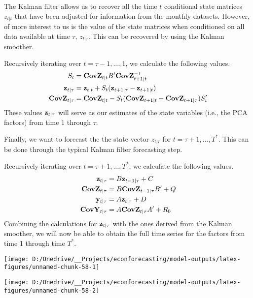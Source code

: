 \documentclass[11pt, letterpaper]{article}\usepackage[]{graphicx}\usepackage[]{color}
\newcommand{\vv}[1]{\textcolor{black}{\mathbf{#1}}}
\begin{document}
The Kalman filter allows us to recover all the time $t$ conditional state matrices $z_{t|t}$ that have been adjusted for information from the monthly datasets. However, of more interest to us is the value of the state matrices when conditioned on all data available at time $\tau$, $z_{t|\tau}$. This can be recovered by using the Kalman smoother.

Recursively iterating over $t = \tau - 1, \dots, 1$, we calculate the following values. 
\begin{align*}
	S_{t} &= \vv{CovZ}_{t|t} B' \vv{CovZ}^{-1}_{t + 1|t}\\
	\vv{z}_{t|\tau} &= \vv{z}_{t|t} + S_t (\vv{z}_{t+1|\tau} - \vv{z}_{t + 1|t})\\
	\vv{CovZ}_{t|\tau} &= \vv{CovZ}_{t|t} - S_t(\vv{CovZ}_{t + 1|t} - \vv{CovZ}_{t + 1|\tau})S'_t
\end{align*}
These values $\vv{z}_{t|\tau}$ will serve as our estimates of the state variables (i.e., the PCA factors) from time 1 through $\tau$.

Finally, we want to forecast the the state vector $z_{t|\tau}$ for $t = \tau + 1, \dots, T^*$. This can be done through the typical Kalman filter forecasting step.

Recursively iterating over $t = \tau + 1, \dots, T^*$, we calculate the following values.
\begin{align*}
	\vv{z}_{t|\tau} &= B \vv{z}_{t-1|\tau} + C\\
	\vv{CovZ}_{t|\tau} &= B \vv{CovZ}_{t-1|\tau} B'+ Q\\
	\vv{y}_{t|\tau} &= A \vv{z}_{t|\tau} + D\\
	\vv{CovY}_{t|\tau} &= A \vv{CovZ}_{t|\tau} A' + R_0
\end{align*}
Combining the calculations for $\vv{z}_{t|\tau}$ with the ones derived from the Kalman smoother, we will now be able to obtain the full time series for the factors from time 1 through time $T^*$.



{\centering \texttt{[image: D:/Onedrive/\_\_Projects/econforecasting/model-outputs/latex-figures/unnamed-chunk-58-1]} 

}




{\centering \texttt{[image: D:/Onedrive/\_\_Projects/econforecasting/model-outputs/latex-figures/unnamed-chunk-58-2]} 

}
\end{document}

